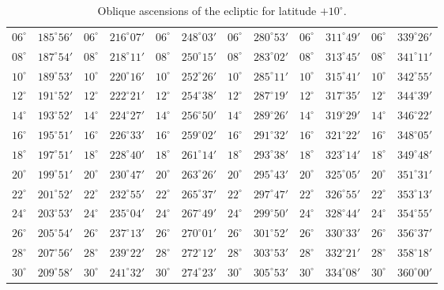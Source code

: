 \begin{table}[!h]
{\begin{tabular}{cc|cc|cc|cc|cc|cc}
$06^\circ$ & $185^\circ56'$ & $06^\circ$ & $216^\circ07'$ & $06^\circ$ & $248^\circ03'$ & $06^\circ$ & $280^\circ53'$ &  $06^\circ$ & $311^\circ49'$ & $06^\circ$ & $339^\circ26'$\\
$08^\circ$ & $187^\circ54'$ & $08^\circ$ & $218^\circ11'$ & $08^\circ$ & $250^\circ15'$ & $08^\circ$ & $283^\circ02'$ &  $08^\circ$ & $313^\circ45'$ & $08^\circ$ & $341^\circ11'$\\
$10^\circ$ & $189^\circ53'$ & $10^\circ$ & $220^\circ16'$ & $10^\circ$ & $252^\circ26'$ & $10^\circ$ & $285^\circ11'$ &  $10^\circ$ & $315^\circ41'$ & $10^\circ$ & $342^\circ55'$\\
$12^\circ$ & $191^\circ52'$ & $12^\circ$ & $222^\circ21'$ & $12^\circ$ & $254^\circ38'$ & $12^\circ$ & $287^\circ19'$ &  $12^\circ$ & $317^\circ35'$ & $12^\circ$ & $344^\circ39'$\\
$14^\circ$ & $193^\circ52'$ & $14^\circ$ & $224^\circ27'$ & $14^\circ$ & $256^\circ50'$ & $14^\circ$ & $289^\circ26'$ &  $14^\circ$ & $319^\circ29'$ & $14^\circ$ & $346^\circ22'$\\
$16^\circ$ & $195^\circ51'$ & $16^\circ$ & $226^\circ33'$ & $16^\circ$ & $259^\circ02'$ & $16^\circ$ & $291^\circ32'$ &  $16^\circ$ & $321^\circ22'$ & $16^\circ$ & $348^\circ05'$\\
$18^\circ$ & $197^\circ51'$ & $18^\circ$ & $228^\circ40'$ & $18^\circ$ & $261^\circ14'$ & $18^\circ$ & $293^\circ38'$ &  $18^\circ$ & $323^\circ14'$ & $18^\circ$ & $349^\circ48'$\\
$20^\circ$ & $199^\circ51'$ & $20^\circ$ & $230^\circ47'$ & $20^\circ$ & $263^\circ26'$ & $20^\circ$ & $295^\circ43'$ &  $20^\circ$ & $325^\circ05'$ & $20^\circ$ & $351^\circ31'$\\
$22^\circ$ & $201^\circ52'$ & $22^\circ$ & $232^\circ55'$ & $22^\circ$ & $265^\circ37'$ & $22^\circ$ & $297^\circ47'$ &  $22^\circ$ & $326^\circ55'$ & $22^\circ$ & $353^\circ13'$\\
$24^\circ$ & $203^\circ53'$ & $24^\circ$ & $235^\circ04'$ & $24^\circ$ & $267^\circ49'$ & $24^\circ$ & $299^\circ50'$ &  $24^\circ$ & $328^\circ44'$ & $24^\circ$ & $354^\circ55'$\\
$26^\circ$ & $205^\circ54'$ & $26^\circ$ & $237^\circ13'$ & $26^\circ$ & $270^\circ01'$ & $26^\circ$ & $301^\circ52'$ &  $26^\circ$ & $330^\circ33'$ & $26^\circ$ & $356^\circ37'$\\
$28^\circ$ & $207^\circ56'$ & $28^\circ$ & $239^\circ22'$ & $28^\circ$ & $272^\circ12'$ & $28^\circ$ & $303^\circ53'$ &  $28^\circ$ & $332^\circ21'$ & $28^\circ$ & $358^\circ18'$\\
$30^\circ$ & $209^\circ58'$ & $30^\circ$ & $241^\circ32'$ & $30^\circ$ & $274^\circ23'$ & $30^\circ$ & $305^\circ53'$ &  $30^\circ$ & $334^\circ08'$ & $30^\circ$ & $360^\circ00'$\\
\end{tabular}}
\caption{Oblique ascensions of the ecliptic for latitude $+10^\circ$.}\label{tx1}
\end{table}

